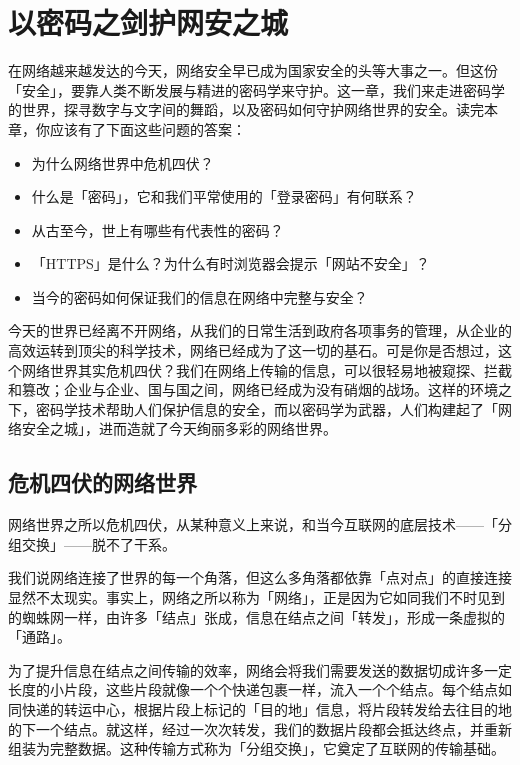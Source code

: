 \chapter{以密码之剑护网安之城}
\label{cha:introduction-to-cryptology}

\begin{intro}
  在网络越来越发达的今天，网络安全早已成为国家安全的头等大事之一。但这份「安全」，要靠人类不断发展与精进的密码学来守护。这一章，我们来走进密码学的世界，探寻数字与文字间的舞蹈，以及密码如何守护网络世界的安全。读完本章，你应该有了下面这些问题的答案：
  \begin{itemize}
    \item 为什么网络世界中危机四伏？
    \item 什么是「密码」，它和我们平常使用的「登录密码」有何联系？
    \item 从古至今，世上有哪些有代表性的密码？
    \item 「HTTPS」是什么？为什么有时浏览器会提示「网站不安全」？
    \item 当今的密码如何保证我们的信息在网络中完整与安全？
  \end{itemize}
\end{intro}

今天的世界已经离不开网络，从我们的日常生活到政府各项事务的管理，从企业的高效运转到顶尖的科学技术，网络已经成为了这一切的基石。可是你是否想过，这个网络世界其实危机四伏？我们在网络上传输的信息，可以很轻易地被窥探、拦截和篡改；企业与企业、国与国之间，网络已经成为没有硝烟的战场。这样的环境之下，密码学技术帮助人们保护信息的安全，而以密码学为武器，人们构建起了「网络安全之城」，进而造就了今天绚丽多彩的网络世界。

\section{危机四伏的网络世界}

网络世界之所以危机四伏，从某种意义上来说，和当今互联网的底层技术——「分组交换」——脱不了干系。

我们说网络连接了世界的每一个角落，但这么多角落都依靠「点对点」的直接连接显然不太现实。事实上，网络之所以称为「网络」，正是因为它如同我们不时见到的蜘蛛网一样，由许多「结点」张成，信息在结点之间「转发」，形成一条虚拟的「通路」。

为了提升信息在结点之间传输的效率，网络会将我们需要发送的数据切成许多一定长度的小片段，这些片段就像一个个快递包裹一样，流入一个个结点。每个结点如同快递的转运中心，根据片段上标记的「目的地」信息，将片段转发给去往目的地的下一个结点。就这样，经过一次次转发，我们的数据片段都会抵达终点，并重新组装为完整数据。这种传输方式称为「分组交换」，它奠定了互联网的传输基础。

